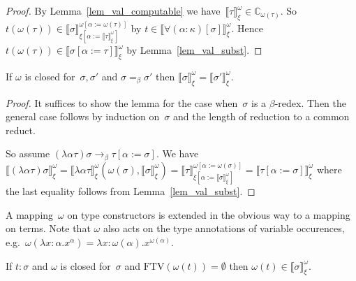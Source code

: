 \documentclass[runningheads,a4paper]{llncs}
\newcommand{\subst}[2]{#1:=#2}
\newcommand{\FTV}{\mathrm{FTV}}
\newcommand{\Cb}{\mathbb{C}}
\newcommand{\val}[3]{\ensuremath{\llbracket#1\rrbracket_{#2}^{#3}}}
\begin{document}
\begin{proof}
  By Lemma~\ref{lem_val_computable} we have~$\val{\tau}{\xi}{\omega}
  \in \Cb_{\omega(\tau)}$. So $t (\omega(\tau)) \in
  \val{\sigma}{\xi[\subst{\alpha}{\val{\tau}{\xi}{\omega}}]}{\omega[\subst{\alpha}{\omega(\tau)}]}$
  by $t \in \val{\forall(\alpha:\kappa)[\sigma]}{\xi}{\omega}$. Hence
  $t (\omega(\tau)) \in
  \val{\sigma[\subst{\alpha}{\tau}]}{\xi}{\omega}$ by
  Lemma~\ref{lem_val_subst}.
\end{proof}


\begin{lemma}\label{lem_beta_val}
  If $\omega$ is closed for~$\sigma,\sigma'$ and $\sigma =_\beta
  \sigma'$ then $\val{\sigma}{\xi}{\omega} =
  \val{\sigma'}{\xi}{\omega}$.
\end{lemma}

\begin{proof}
  It suffices to show the lemma for the case when~$\sigma$ is a
  $\beta$-redex. Then the general case follows by induction
  on~$\sigma$ and the length of reduction to a common reduct.

  So assume $(\lambda\alpha\tau)\sigma \to_\beta
  \tau[\subst{\alpha}{\sigma}]$. We have
  $\val{(\lambda\alpha\tau)\sigma}{\xi}{\omega} =
  \val{\lambda\alpha\tau}{\xi}{\omega}(\omega(\sigma),
  \val{\sigma}{\xi}{\omega}) =
  \val{\tau}{\xi[\subst{\alpha}{\val{\sigma}{\xi}{\omega}}]}{\omega[\subst{\alpha}{\omega(\sigma)}]}
  = \val{\tau[\subst{\alpha}{\sigma}]}{\xi}{\omega}$ where the last
  equality follows from Lemma~\ref{lem_val_subst}.
\end{proof}

A mapping~$\omega$ on type constructors is extended in the obvious way
to a mapping on terms. Note that $\omega$ also acts on the type
annotations of variable occurences, e.g.~$\omega(\lambda x : \alpha
. x^\alpha) = \lambda x : \omega(\alpha) . x^{\omega(\alpha)}$.

\begin{lemma}\label{lem_typable_computable}
  If $t : \sigma$ and $\omega$ is closed for~$\sigma$ and
  $\FTV(\omega(t)) = \emptyset$ then $\omega(t) \in
  \val{\sigma}{\xi}{\omega}$.
\end{lemma}
\end{document}
